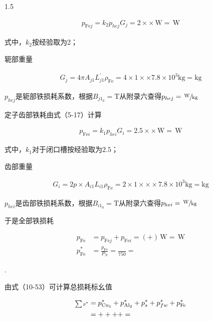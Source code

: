 \documentclass[a4paper,11pt]{ctexart}
\newcommand{\W}{\,\text{W}}
\newcommand{\T}{\text{T}}
\newcommand{\kg}{\text{kg}}
\newcommand{\ssum}{\scriptscriptstyle \sum}
\newenvironment{shrinkeq}[2]
{
	\bgroup
	\addtolength\abovedisplayshortskip{#1}
	\addtolength\abovedisplayskip{#1}
	\addtolength\belowdisplayshortskip{#2}
	\addtolength\belowdisplayskip{#2}
}
{
	\egroup
	\ignorespacesafterend
}
\newcounter{designitem}
\newcommand{\entry}
{
	\vspace{0.5em}
	\par
	\stepcounter{designitem}
	\thedesignitem.
}
\begin{document}
\begin{spacing}{1.5}
\begin{shrinkeq}{-1.5ex}{-1.5ex}
	\begin{align}
	p_{\text{Fe}j} = k_2p_{hej}G_j = 2\times \times \W = \W
	\end{align}
\end{shrinkeq}
式中，$k_2$按经验取为2；
\par
轭部重量
\begin{shrinkeq}{-1.5ex}{-1.5ex}
	\begin{align}
	G_{j} = 4\pi A_{j1}L_{j1}^{'}\rho_{\text{Fe}} = 4\times 1\times \times 7.8\times 10^{3}\kg = \kg
	\end{align}
\end{shrinkeq}
\par
$p_{hej}$是轭部铁损耗系数，根据$B_{j1_0} = \T$从附录六查得$p_{hej} = \sfrac{\W}{\kg}$
\par
定子齿部铁耗由式（5-17）计算
\begin{shrinkeq}{-1.5ex}{-1.5ex}
	\begin{align}
	p_{\text{Fe}i} = k_1p_{hei}G_{i} = 2.5\times \times \W = \W
	\end{align}
\end{shrinkeq}
式中，$k_1$对于闭口槽按经验取为$2.5$；
\par
齿部重量
\begin{shrinkeq}{-1.5ex}{-1.5ex}
	\begin{align}
	G_{i} = 2p\times A_{i1}L_{i1}\rho_{\text{Fe}} = 2\times 1\times \times \times 7.8\times 10^{3}\kg = \kg
	\end{align}
\end{shrinkeq}
\par
$p_{hei}$是齿部铁损耗系数，根据$B_{i1_0} = \T$从附录六查得$p_{hei} = \sfrac{\W}{\kg}$
\par
于是全部铁损耗
\begin{shrinkeq}{-1.5ex}{-1.5ex}
	\begin{align}
	p_{\text{Fe}} &= p_{\text{Fe}j}+p_{\text{Fe}i} = \left( + \right)\W = \W\\
	p_{\text{Fe}}^{*}&=\frac{p_{\text{Fe}} }{P_{N}} = \frac{ }{750} =   
	\end{align}
\end{shrinkeq}
\entry
由式（10-53）可计算总损耗标幺值
\begin{shrinkeq}{-1.5ex}{-1.5ex}
	\begin{align}
	\ssum p^{*} &= p_{\text{Cu}_1}^{*}+p_{\text{Al}_2}^{*}+p_{s}^{*}+p_{fw}^{*}+p_{\text{Fe}}^{*}\\
	&= + + + + = \notag  
	\end{align}

\end{shrinkeq}
\end{spacing}
\end{document}
